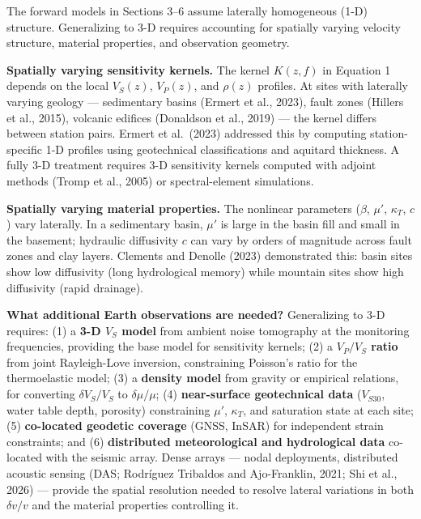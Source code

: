 \documentclass[12pt]{article}
\begin{document}
The forward models in Sections 3--6 assume laterally homogeneous (1-D)
structure. Generalizing to 3-D requires accounting for spatially varying
velocity structure, material properties, and observation geometry.

\textbf{Spatially varying sensitivity kernels.} The kernel \(K(z, f)\)
in Equation 1 depends on the local \(V_S(z)\), \(V_P(z)\), and
\(\rho(z)\) profiles. At sites with laterally varying geology ---
sedimentary basins (Ermert et al., 2023), fault zones (Hillers et al.,
2015), volcanic edifices (Donaldson et al., 2019) --- the kernel differs
between station pairs. Ermert et al.~(2023) addressed this by computing
station-specific 1-D profiles using geotechnical classifications and
aquitard thickness. A fully 3-D treatment requires 3-D sensitivity
kernels computed with adjoint methods (Tromp et al., 2005) or
spectral-element simulations.

\textbf{Spatially varying material properties.} The nonlinear parameters
(\(\beta\), \(\mu'\), \(\kappa_T\), \(c\)) vary laterally. In a
sedimentary basin, \(\mu'\) is large in the basin fill and small in the
basement; hydraulic diffusivity \(c\) can vary by orders of magnitude
across fault zones and clay layers. Clements and Denolle (2023)
demonstrated this: basin sites show low diffusivity (long hydrological
memory) while mountain sites show high diffusivity (rapid drainage).

\textbf{What additional Earth observations are needed?} Generalizing to
3-D requires: (1) a \textbf{3-D \(V_S\) model} from ambient noise
tomography at the monitoring frequencies, providing the base model for
sensitivity kernels; (2) a \textbf{\(V_P/V_S\) ratio} from joint
Rayleigh-Love inversion, constraining Poisson's ratio for the
thermoelastic model; (3) a \textbf{density model} from gravity or
empirical relations, for converting \(\delta V_S/V_S\) to
\(\delta\mu/\mu\); (4) \textbf{near-surface geotechnical data}
(\(V_{S30}\), water table depth, porosity) constraining \(\mu'\),
\(\kappa_T\), and saturation state at each site; (5) \textbf{co-located
geodetic coverage} (GNSS, InSAR) for independent strain constraints; and
(6) \textbf{distributed meteorological and hydrological data} co-located
with the seismic array. Dense arrays --- nodal deployments, distributed
acoustic sensing (DAS; Rodríguez Tribaldos and Ajo-Franklin, 2021; Shi
et al., 2026) --- provide the spatial resolution needed to resolve
lateral variations in both \(\delta v/v\) and the material properties
controlling it.
\end{document}
